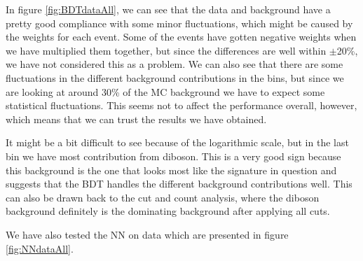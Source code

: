 In figure \ref{fig:BDTdataAll}, we can see that the data and background have a pretty good compliance with some minor fluctuations, which might be caused by the weights for each event. Some of the events have gotten negative weights when we have multiplied them together, but since the differences are well within $\pm$20\%, we have not considered this as a problem. We can also see that there are some fluctuations in the different background contributions in the bins, but since we are looking at around 30\% of the MC background we have to expect some statistical fluctuations. This seems not to affect the performance overall, however, which means that we can trust the results we have obtained. 

It might be a bit difficult to see because of the logarithmic scale, but in the last bin we have most contribution from diboson. This is a very good sign because this background is the one that looks most like the signature in question and suggests that the BDT handles the different background contributions well. This can also be drawn back to the cut and count analysis, where the diboson background definitely is the dominating background after applying all cuts. 

We have also tested the NN on data which are presented in figure \ref{fig:NNdataAll}.

